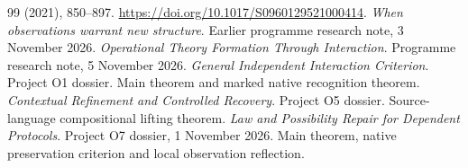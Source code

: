 \documentclass[11pt]{article}
\theoremstyle{definition}
\theoremstyle{remark}
\begin{document}
\begin{thebibliography}{99}
(2021), 850--897.
\url{https://doi.org/10.1017/S0960129521000414}.
\emph{When observations warrant new structure}.
Earlier programme research note, 3 November 2026.
\emph{Operational Theory Formation Through Interaction}.
Programme research note, 5 November 2026.
\emph{General Independent Interaction Criterion}.
Project O1 dossier. Main theorem and marked native recognition theorem.
\emph{Contextual Refinement and Controlled Recovery}.
Project O5 dossier. Source-language compositional lifting theorem.
\emph{Law and Possibility Repair for Dependent Protocols}.
Project O7 dossier, 1 November 2026. Main theorem, native preservation
criterion and local observation reflection.
\end{thebibliography}
\end{document}
